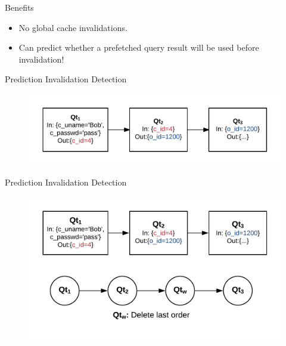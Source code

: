 \documentclass[10pt]{beamer}
\begin{document}
\begin{frame}[fragile]{Benefits}
    \begin{itemize}
        \item{No global cache invalidations.}
        \item{Can predict whether a prefetched query result will be used before invalidation!}
    \end{itemize}
\end{frame}

\begin{frame}[fragile]{Prediction Invalidation Detection}
    \begin{figure}
        \includegraphics[scale=0.22]{apollo_query_pipeline}
    \end{figure}
\end{frame}

\begin{frame}[fragile]{Prediction Invalidation Detection}
    \begin{figure}
        \center
        \includegraphics[scale=0.22]{apollo_write_boundary}
    \end{figure}
\end{frame}
\end{document}
